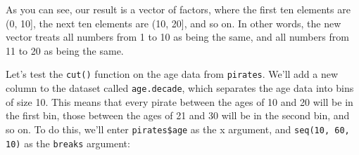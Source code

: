 \documentclass{tufte-book}\usepackage[]{graphicx}\usepackage[]{color}
\makeatletter
\newcommand{\hlnum}[1]{\textcolor[rgb]{0.686,0.059,0.569}{#1}}%
\newcommand{\hlcom}[1]{\textcolor[rgb]{0.678,0.584,0.686}{\textit{#1}}}%
\newcommand{\hlopt}[1]{\textcolor[rgb]{0,0,0}{#1}}%
\newcommand{\hlstd}[1]{\textcolor[rgb]{0.345,0.345,0.345}{#1}}%
\newcommand{\hlkwb}[1]{\textcolor[rgb]{0.69,0.353,0.396}{#1}}%
\newcommand{\hlkwc}[1]{\textcolor[rgb]{0.333,0.667,0.333}{#1}}%
\newcommand{\hlkwd}[1]{\textcolor[rgb]{0.737,0.353,0.396}{\textbf{#1}}}%
\newenvironment{kframe}{%
 \def\at@end@of@kframe{}%
 \ifinner\ifhmode%
  \def\at@end@of@kframe{\end{minipage}}%
  \begin{minipage}{\columnwidth}%
 \fi\fi%
 \def\FrameCommand##1{\hskip\@totalleftmargin \hskip-\fboxsep
 \colorbox{shadecolor}{##1}\hskip-\fboxsep
     \hskip-\linewidth \hskip-\@totalleftmargin \hskip\columnwidth}%
 \MakeFramed {\advance\hsize-\width
   \@totalleftmargin\z@ \linewidth\hsize
   \@setminipage}}%
 {\par\unskip\endMakeFramed%
 \at@end@of@kframe}
\newenvironment{knitrout}{}{} %
\makeatother
\begin{document}
As you can see, our result is a vector of factors, where the first ten elements are (0, 10], the next ten elements are (10, 20], and so on. In other words, the new vector treats all numbers from 1 to 10 as being the same, and all numbers from 11 to 20 as being the same.

Let's test the \texttt{cut()} function on the age data from \texttt{pirates}. We'll add a new column to the dataset called \texttt{age.decade}, which separates the age data into bins of size 10. This means that every pirate between the ages of 10 and 20 will be in the first bin, those between the ages of 21 and 30 will be in the second bin, and so on. To do this, we'll enter \texttt{pirates\$age} as the x argument, and \texttt{seq(10, 60, 10)} as the \texttt{breaks} argument:

\end{document}
